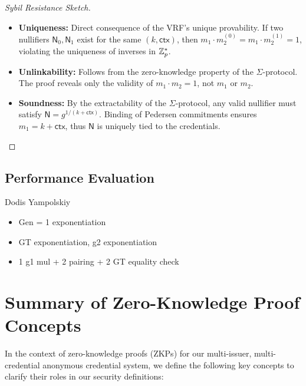 \begin{proof}[Sybil Resistance Sketch]
\begin{itemize}
    \item \textbf{Uniqueness:} Direct consequence of the VRF’s unique provability. If two nullifiers $\textsf{N}_0, \textsf{N}_1$ exist for the same $(k, \textsf{ctx})$, then $m_1 \cdot m_2^{(0)} = m_1 \cdot m_2^{(1)} = 1$, violating the uniqueness of inverses in $\mathbb{Z}_p^*$.
    
    \item \textbf{Unlinkability:} Follows from the zero-knowledge property of the $\Sigma$-protocol. The proof reveals only the validity of $m_1 \cdot m_2 = 1$, not $m_1$ or $m_2$.
    
    \item \textbf{Soundness:} By the extractability of the $\Sigma$-protocol, any valid nullifier must satisfy $\textsf{N} = g^{1/(k + \textsf{ctx})}$. Binding of Pedersen commitments ensures $m_1 = k + \textsf{ctx}$, thus $\textsf{N}$ is uniquely tied to the credentials.
\end{itemize}
\end{proof}

\subsection{Performance Evaluation}


Dodis Yampolskiy
\begin{itemize}
    \item Gen = 1 exponentiation 
    \item GT exponentiation, g2 exponentiation 
    \item 1 g1 mul + 2 pairing + 2 GT equality check
\end{itemize}











\newpage
\section{Summary of Zero-Knowledge Proof Concepts}

In the context of zero-knowledge proofs (ZKPs) for our multi-issuer, multi-credential anonymous credential system, we define the following key concepts to clarify their roles in our security definitions:

